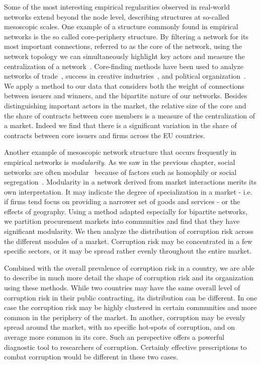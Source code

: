 Some of the most interesting empirical regularities observed in real-world networks extend beyond the node level, describing structures at so-called mesoscopic scales. One example of a structure commonly found in empirical networks is the so called core-periphery structure. By filtering a network for its most important connections, referred to as the core of the network, using the network topology we can simultaneously highlight key actors and measure the centralization of a network~\cite{dorogovtsev2006k,csermely2013structure}. Core-finding methods have been used to analyze networks of trade~\cite{mahutga2006persistence}, success in creative industries~\cite{cattani2008core}, and political organization~\cite{barbera2015critical}. We apply a method to our data that considers both the weight of connections between issuers and winners, and the bipartite nature of our networks. Besides distinguishing important actors in the market, the relative size of the core and the share of contracts between core members is a measure of the centralization of a market. Indeed we find that there is a significant variation in the share of contracts between core issuers and firms across the EU countries.

Another example of mesoscopic network structure that occurs frequently in empirical networks is \textit{modularity}. As we saw in the previous chapter, social networks are often modular~\cite{newman2006modularity} because of factors such as homophily or social segregation~\cite{kossinets2009origins}. Modularity in a network derived from market interactions merits its own interpretation. It may indicate the degree of specialization in a market - i.e. if firms tend focus on providing a narrower set of goods and services - or the effects of geography. Using a method adapted especially for bipartite networks, we partition procurement markets into communities and find that they have significant modularity. We then analyze the distribution of corruption risk across the different modules of a market. Corruption risk may be concentrated in a few specific sectors, or it may be spread rather evenly throughout the entire market.

Combined with the overall prevalence of corruption risk in a country, we are able to describe in much more detail the shape of corruption risk and its organization using these methods. While two countries may have the same overall level of corruption risk in their public contracting, its distribution can be different. In one case the corruption risk may be highly clustered in certain communities and more common in the periphery of the market. In another, corruption may be evenly spread around the market, with no specific hot-spots of corruption, and on average more common in its core. Such an perspective offers a powerful diagnostic tool to researchers of corruption. Certainly effective prescriptions to combat corruption would be different in these two cases.

